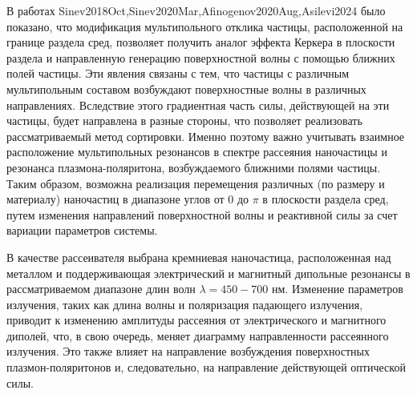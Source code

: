 В работах Sinev2018Oct,Sinev2020Mar,Afinogenov2020Aug,Asilevi2024 было показано, что модификация мультипольного отклика частицы, расположенной на границе раздела сред, позволяет получить аналог эффекта Керкера в плоскости раздела и направленную генерацию поверхностной волны с помощью ближних полей частицы. Эти явления связаны с тем, что частицы с различным мультипольным составом возбуждают поверхностные волны в различных направлениях. Вследствие этого градиентная часть силы, действующей на эти частицы, будет направлена в разные стороны, что позволяет реализовать рассматриваемый метод сортировки. Именно поэтому важно учитывать взаимное расположение мультипольных резонансов в спектре рассеяния наночастицы и резонанса плазмона-поляритона, возбуждаемого ближними полями частицы. Таким образом, возможна реализация перемещения различных (по размеру и материалу) наночастиц в диапазоне углов от 0 до $\pi$ в плоскости раздела сред, путем изменения направлений поверхностной волны и реактивной силы за счет вариации параметров системы.

В качестве рассеивателя выбрана кремниевая наночастица, расположенная над металлом и поддерживающая электрический и магнитный дипольные резонансы в рассматриваемом диапазоне длин волн $\lambda=450-700$ нм. Изменение параметров излучения, таких как длина волны и поляризация падающего излучения, приводит к изменению амплитуды рассеяния от электрического и магнитного диполей, что, в свою очередь, меняет диаграмму направленности рассеянного излучения. Это также влияет на направление возбуждения поверхностных плазмон-поляритонов и, следовательно, на направление действующей оптической силы.
